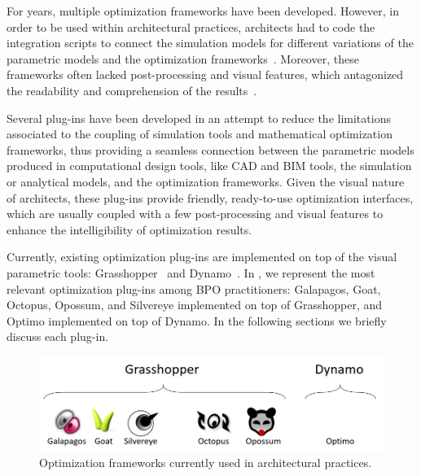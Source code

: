 For years, multiple optimization frameworks have been developed. However, in order to be used within architectural practices, architects had to code the integration scripts to connect the simulation models for different variations of the parametric models and the optimization frameworks~\cite{Attia2013}. Moreover, these frameworks often lacked post-processing and visual features, which antagonized the readability and comprehension of the results~\cite{Attia2013,Nguyen2014}.
	
Several plug-ins have been developed in an attempt to reduce the limitations associated to the coupling of simulation tools and mathematical optimization frameworks, thus providing a seamless connection between the parametric models produced in computational design tools, like \ac{CAD} and \ac{BIM} tools, the simulation or analytical models, and the optimization frameworks. Given the visual nature of architects, these plug-ins provide friendly, ready-to-use optimization interfaces, which are usually coupled with a few post-processing and visual features to enhance the intelligibility of optimization results. 
	
Currently, existing optimization plug-ins are implemented on top of the visual parametric tools: Grasshopper~\cite{GRASSHOPPER} and Dynamo~\cite{DYNAMOBIM}. In , we represent the most relevant optimization plug-ins among \ac{BPO} practitioners: Galapagos, Goat, Octopus, Opossum, and Silvereye implemented on top of Grasshopper, and Optimo implemented on top of Dynamo. In the following sections we briefly discuss each plug-in.
	
\begin{figure}
\centering
\includegraphics[width=\textwidth]{Images/Background/opt-plugins.PNG}
\caption[Optimization Frameworks in the Architectural Practice]{Optimization frameworks currently used in architectural practices.}
\label{fig:opt-plugins}
\end{figure}

